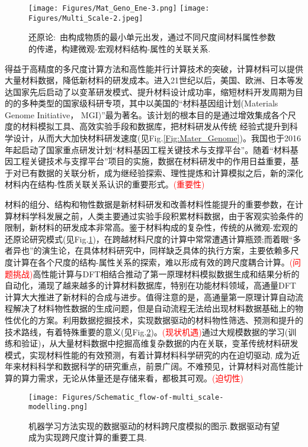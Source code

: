 \begin{figure}[h!]
\centering
\vspace*{-0.05in}
\texttt{[image: Figures/Mat\_Geno\_Ene-3.png]}
\texttt{[image: Figures/Multi\_Scale-2.jpeg]}
\caption{还原论:~由构成物质的最小单元出发，通过不同尺度间材料属性参数的传递，构建微观-宏观材料结构-属性的关联关系.}
\label{Fig:Mater_Genome-3}
\end{figure}
得益于高精度的多尺度计算方法和高性能并行计算技术的突破，计算材料可以提供大量材料数据，降低新材料的研发成本。进入21世纪以后，美国、欧洲、日本等发达国家先后启动了以变革研发模式、提升材料设计成功率，缩短材料开发周期为目的的多种类型的国家级科研专项，其中以美国的“材料基因组计划\textrm{(Materials Genome Initiative， MGI)}”最为著名。该计划的根本目的是通过增效集成各个尺度的材料模拟工具、高效实验手段和数据库，把材料研发从传统 经验式提升到科学设计，从而大大加快材料研发速度(见\textrm{Fig.}\ref{Fig:Mater_Genome})。我国也于2016年起启动了国家重点研发计划“材料基因工程关键技术与支撑平台”。随着``材料基因工程关键技术与支撑平台''项目的实施，数据在材料研发中的作用日益重要，基于对已有数据的关联分析，成为继经验探索、理性提炼和计算模拟之后，新的深化材料内在结构-性质关联关系认识的重要形式。\textcolor{red}{(重要性)}

材料的组分、结构和物性数据是新材料研发和改善材料性能提升的重要参数，在计算材料学科发展之前，人类主要通过实验手段积累材料数据，由于客观实验条件的限制，新材料的研发成本非常高。鉴于材料构成的复杂性，传统的从微观-宏观的还原论研究模式(见\textrm{Fig.}\ref{Fig:Mater_Genome-3})，在跨越材料尺度的计算中常常遭遇计算瓶颈;而着眼``多者异也''的演生论，在具体材料研究中，同样缺乏具体的执行方案，主要依赖多尺度计算在各个尺度的结构-属性关系的探索，难以形成有效的跨尺度耦合计算。\textcolor{red}{(问题挑战)}高性能计算与\textrm{DFT}相结合推动了第一原理材料模拟数据生成和结果分析的自动化，涌现了越来越多的计算材料数据库，特别在功能材料领域，高通量\textrm{DFT}计算大大推进了新材料的合成与进步。值得注意的是，高通量第一原理计算自动流程解决了材料物性数据的生成问题，但是自动流程无法给出现材料数据基础上的物性优化的方案。利用数据挖掘技术，实现数据驱动的材料物性筛选、预测和提升的技术路线，有着特殊重要的意义(见\textrm{Fig.}\ref{Fig:Multi_scale-modelling})。\textcolor{red}{(现状机遇)}通过大规模数据的学习(训练和验证)，从大量材料数据中挖掘高维复杂数据的内在关联，变革传统材料研发模式，实现材料性能的有效预测，有着计算材料科学研究的内在迫切驱动, 成为近年来材料科学和数据科学的研究重点，前景广阔。不难预见，计算材料对高性能计算的算力需求，无论从体量还是存储来看，都极其可观。\textcolor{red}{(迫切性)}
\begin{figure}[h!]
\centering
\vspace*{-0.05in}
\texttt{[image: Figures/Schematic\_flow-of-multi\_scale-modelling.png]}
\caption{机器学习方法实现的数据驱动的材料跨尺度模拟的图示.数据驱动有望成为实现跨尺度计算的重要工具.}
\label{Fig:Multi_scale-modelling}
\end{figure}

